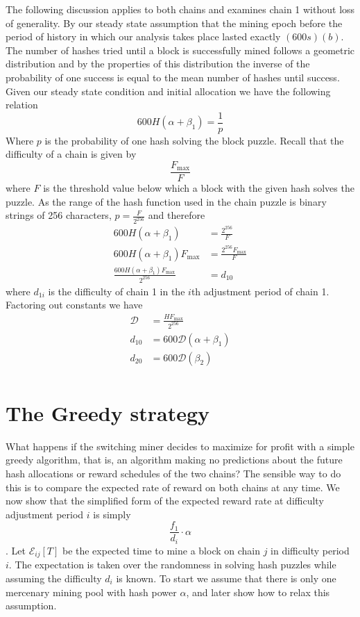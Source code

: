 \documentclass[10pt, preprint]{aastex}
\begin{document}
The following discussion applies to both chains and examines chain 1 without loss of generality.  By our steady state assumption that the mining epoch before the period of history in which our analysis takes place lasted exactly $(600 s)(b)$.  The number of hashes tried until a block is successfully mined follows a geometric distribution and by the properties of this distribution the inverse of the probability of one success is equal to the mean number of hashes until success.  Given our steady state condition and initial allocation we have the following relation
$$
600 H(\alpha+ \beta_1) = \frac{1}{p}
$$
Where $p$ is the probability of one hash solving the block puzzle.
Recall that the difficulty of a chain is given by
$$
\frac{F_{\text{max}}}{F}
$$
where $F$ is the threshold value below which a block with the given hash solves the puzzle.  As the range of the hash function used in the chain puzzle is binary strings of 256 characters, $p = \frac{F}{2^{256}}$ and therefore
\begin{align*}
600 H(\alpha + \beta_1) &= \frac{2^{256}}{F}\\
600 H(\alpha + \beta_1)F_{\text{max}} &= \frac{2^{256}F_{\text{max}}}{F}\\
\frac{600 H(\alpha + \beta_1)F_{\text{max}} }{2^{256}} &= d_{10}
\end{align*}
where $d_{1i}$ is the difficulty of chain 1 in the $i$th adjustment period of chain 1.  Factoring out constants we have
\begin{align*}
\mathcal{D} &= \frac{HF_{\text{max}} }{2^{256}}\\
d_{10} &= 600\mathcal{D} (\alpha + \beta_1)\\
d_{20} &= 600\mathcal{D} (\beta_2)\\
\end{align*}

\section{The Greedy strategy}
What happens if the switching miner decides to maximize for profit with a simple greedy algorithm, that is, an algorithm making no predictions about the future hash allocations or reward schedules of the two chains?  The sensible way to do this is to compare the expected rate of reward on both chains at any time.  We now show that the simplified form of the expected reward rate at difficulty adjustment period $i$ is simply $$\frac{f_1}{d_i} \cdot \alpha$$.  Let $\mathcal{E}_{ij}[T]$ be the expected time to mine a block on chain $j$ in difficulty period $i$.  The expectation is taken over the randomness in solving hash puzzles while assuming the difficulty $d_i$ is known.  To start we assume that there is only one mercenary mining pool with hash power $\alpha$, and later show how to relax this assumption.
\end{document}
